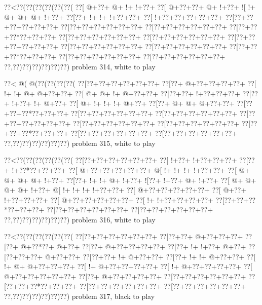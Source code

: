 \vbox{\vbox{\goo
\0??<\0??(\0??(\0??(\0??(\0??(\0??(
\0??[\- @+\0??+\- @+\- !+\- !+\0??+
\0??[\- @+\0??+\0??+\- @+\- !+\0??+
\- ![\- !+\- @+\- @+\- @+\- !+\0??+
\0??[\0??+\- !+\- !+\- !+\0??+\0??+
\0??[\- !+\0??+\0??+\0??+\0??+\0??+
\0??[\0??+\0??+\0??+\0??+\0??+\0??+
\0??[\0??+\0??+\0??+\0??+\0??+\0??+
\0??[\0??+\0??+\0??+\0??+\0??+\0??+
\0??[\0??+\0??+\0??*\0??+\0??+\0??+
\0??[\0??+\0??+\0??+\0??+\0??+\0??+
\0??[\0??+\0??+\0??+\0??+\0??+\0??+
\0??[\0??+\0??+\0??+\0??+\0??+\0??+
\0??[\0??+\0??+\0??+\0??+\0??+\0??+
\0??[\0??+\0??+\0??+\0??+\0??+\0??+
\0??[\0??+\0??+\0??*\0??+\0??+\0??+
\0??[\0??+\0??+\0??+\0??+\0??+\0??+
\0??[\0??+\0??+\0??+\0??+\0??+\0??+
\0??,\0??)\0??)\0??)\0??)\0??)\0??)
}
\hfil problem 314, white to play\hfil\break
}

\vbox{\vbox{\goo
\0??<\- @(\- @(\0??(\0??(\0??(\0??(
\0??[\0??+\0??+\0??+\0??+\0??+\0??+
\0??[\0??+\- @+\0??+\0??+\0??+\0??+
\0??[\- !+\- !+\- @+\- @+\0??+\0??+
\0??[\- @+\- @+\- !+\- @+\0??+\0??+
\0??[\0??+\0??+\- !+\0??+\0??+\0??+
\0??[\0??+\- !+\0??+\- !+\- @+\0??+
\0??[\- @+\- !+\- !+\- !+\- @+\0??+
\0??[\0??+\- @+\- @+\- @+\0??+\0??+
\0??[\0??+\0??+\0??*\0??+\0??+\0??+
\0??[\0??+\0??+\0??+\0??+\0??+\0??+
\0??[\0??+\0??+\0??+\0??+\0??+\0??+
\0??[\0??+\0??+\0??+\0??+\0??+\0??+
\0??[\0??+\0??+\0??+\0??+\0??+\0??+
\0??[\0??+\0??+\0??+\0??+\0??+\0??+
\0??[\0??+\0??+\0??*\0??+\0??+\0??+
\0??[\0??+\0??+\0??+\0??+\0??+\0??+
\0??[\0??+\0??+\0??+\0??+\0??+\0??+
\0??,\0??)\0??)\0??)\0??)\0??)\0??)
}
\hfil problem 315, white to play\hfil\break
}

\vbox{\vbox{\goo
\0??<\0??(\0??(\0??(\0??(\0??(\0??(
\0??[\0??+\0??+\0??+\0??+\0??+\0??+
\0??[\- !+\0??+\- !+\0??+\0??+\0??+
\0??[\0??+\- !+\0??*\0??+\0??+\0??+
\0??[\- @+\0??+\0??+\0??+\0??+\0??+
\- @[\- !+\- !+\- !+\- !+\0??+\0??+
\0??[\- @+\- @+\- @+\- @+\- !+\0??+
\0??[\0??+\- !+\- !+\- @+\- !+\0??+
\- ![\0??+\- !+\0??+\- @+\- !+\0??+
\0??[\- @+\- @+\- @+\- @+\- !+\0??+
\- @[\- !+\- !+\- !+\- !+\0??+\0??+
\0??[\- @+\0??+\0??+\0??+\0??+\0??+
\0??[\- @+\0??+\- !+\0??+\0??+\0??+
\0??[\- @+\0??+\0??+\0??+\0??+\0??+
\0??[\- !+\- !+\0??+\0??+\0??+\0??+
\0??[\0??+\0??+\0??*\0??+\0??+\0??+
\0??[\0??+\0??+\0??+\0??+\0??+\0??+
\0??[\0??+\0??+\0??+\0??+\0??+\0??+
\0??,\0??)\0??)\0??)\0??)\0??)\0??)
}
\hfil problem 316, white to play\hfil\break
}

\vbox{\vbox{\goo
\0??<\0??(\0??(\0??(\0??(\0??(\0??(
\0??[\0??+\0??+\0??+\0??+\0??+\0??+
\0??[\0??+\0??+\- @+\0??+\0??+\0??+
\0??[\0??+\- @+\0??*\0??+\- @+\0??+
\0??[\0??+\- @+\0??+\0??+\0??+\0??+
\0??[\0??+\- !+\- !+\0??+\- @+\0??+
\0??[\0??+\0??+\0??+\- @+\0??+\0??+
\0??[\0??+\0??+\- !+\- @+\0??+\0??+
\0??[\0??+\- !+\- !+\- @+\0??+\0??+
\0??[\- !+\- @+\- @+\0??+\0??+\0??+
\0??[\- !+\- @+\0??+\0??+\0??+\0??+
\0??[\- !+\- @+\0??+\0??+\0??+\0??+
\0??[\- @+\0??+\0??+\0??+\0??+\0??+
\0??[\0??+\- @+\0??+\0??+\0??+\0??+
\0??[\0??+\0??+\0??+\0??+\0??+\0??+
\0??[\0??+\0??+\0??*\0??+\0??+\0??+
\0??[\0??+\0??+\0??+\0??+\0??+\0??+
\0??[\0??+\0??+\0??+\0??+\0??+\0??+
\0??,\0??)\0??)\0??)\0??)\0??)\0??)
}
\hfil problem 317, black to play\hfil\break
}

